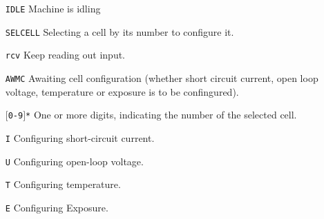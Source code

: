 \documentclass{article}
\begin{document}
\vspace{2em}

\begin{itemize}
    \item[\texttt{IDLE}]
        Machine is idling
    \item[\texttt{SELCELL}]
        Selecting a cell by its number to configure it.
    \item[\texttt{rcv}]
        Keep reading out input.
    \item[\texttt{AWMC}]
        Awaiting cell configuration (whether short circuit current, open loop
        voltage, temperature or exposure is to be confingured).
    \item[\texttt{$[$0-9$]$*}]
        One or more digits, indicating the number of the selected cell.
    \item[\texttt{I}]
        Configuring short-circuit current.
    \item[\texttt{U}]
        Configuring open-loop voltage.
    \item[\texttt{T}]
        Configuring temperature.
    \item[\texttt{E}]
        Configuring Exposure.
\end{itemize}
\end{document}
